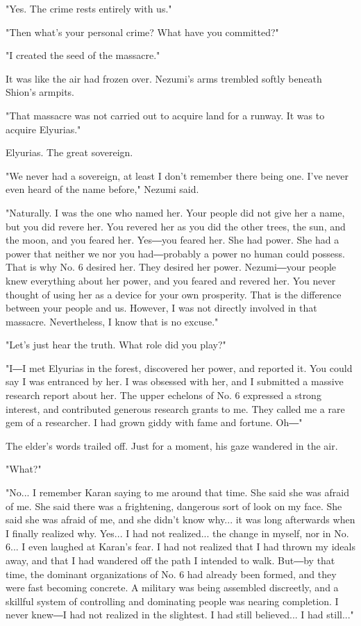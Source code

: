 "Yes. The crime rests entirely with us."

"Then what's your personal crime? What have you committed?"

"I created the seed of the massacre."

It was like the air had frozen over. Nezumi's arms trembled softly
beneath Shion's armpits.

"That massacre was not carried out to acquire land for a runway. It was
to acquire Elyurias."

Elyurias. The great sovereign.

"We never had a sovereign, at least I don't remember there being one.
I've never even heard of the name before," Nezumi said.

"Naturally. I was the one who named her. Your people did not give her a
name, but you did revere her. You revered her as you did the other
trees, the sun, and the moon, and you feared her. Yes―you feared her.
She had power. She had a power that neither we nor you had―probably a
power no human could possess. That is why No. 6 desired her. They
desired her power. Nezumi―your people knew everything about her power,
and you feared and revered her. You never thought of using her as a
device for your own prosperity. That is the difference between your
people and us. However, I was not directly involved in that massacre.
Nevertheless, I know that is no excuse."

"Let's just hear the truth. What role did you play?"

"I―I met Elyurias in the forest, discovered her power, and reported it.
You could say I was entranced by her. I was obsessed with her, and I
submitted a massive research report about her. The upper echelons of No.
6 expressed a strong interest, and contributed generous research grants
to me. They called me a rare gem of a researcher. I had grown giddy with
fame and fortune. Oh―"

The elder's words trailed off. Just for a moment, his gaze wandered in
the air.

"What?"

"No... I remember Karan saying to me around that time. She said she was
afraid of me. She said there was a frightening, dangerous sort of look
on my face. She said she was afraid of me, and she didn't know why... it
was long afterwards when I finally realized why. Yes... I had not
realized... the change in myself, nor in No. 6... I even laughed at
Karan's fear. I had not realized that I had thrown my ideals away, and
that I had wandered off the path I intended to walk. But―by that time,
the dominant organizations of No. 6 had already been formed, and they
were fast becoming concrete. A military was being assembled discreetly,
and a skillful system of controlling and dominating people was nearing
completion. I never knew―I had not realized in the slightest. I had
still believed... I had still..."

